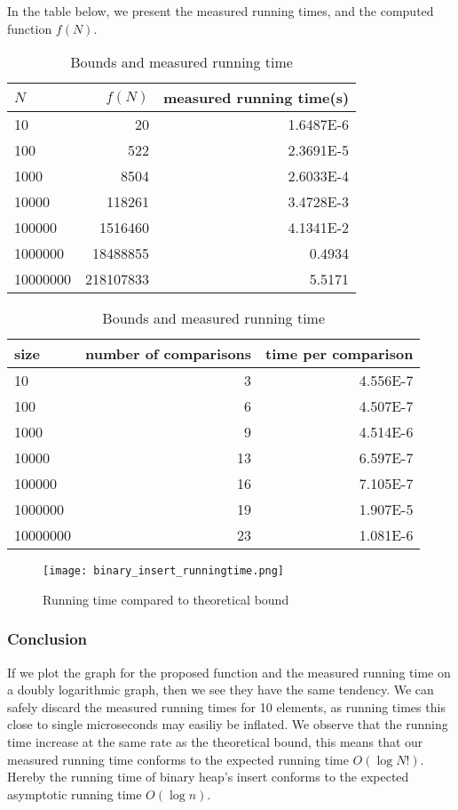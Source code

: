 \documentclass[a4paper,oneside,11pt]{article}
\begin{document}
\begin{itemize}
In the table below, we present the measured running times, and the computed function $f(N)$.
\begin{table}
  \begin{center}
    \begin{tabular}{l|r|r}
      $N$ & $f(N)$ & measured running time(s) \\
      \hline
      10       & 20         & \num{1.6487E-6}\\
      100      & 522        & \num{2.3691E-5}\\
      1000     & 8504       & \num{2.6033E-4}\\
      10000    & 118261     & \num{3.4728E-3}\\
      100000   & 1516460    & \num{4.1341E-2}\\
      1000000  & 18488855   & \num{0.4934}\\
      10000000 & 218107833  & \num{5.5171}
    \end{tabular}
    \caption{Bounds and measured running time}
  \end{center}
\end{table}
\begin{table}
  \begin{center}
    \begin{tabular}{l|r|r}
      size & number of comparisons & time per comparison\\
      \hline
      10       & 3  & \num{4.556E-7}\\
      100      & 6  & \num{4.507E-7}\\
      1000     & 9  & \num{4.514E-6}\\
      10000    & 13 & \num{6.597E-7}\\
      100000   & 16 & \num{7.105E-7}\\
      1000000  & 19 & \num{1.907E-5}\\
      10000000 & 23 & \num{1.081E-6}
    \end{tabular}
    \caption{Bounds and measured running time}
  \end{center}
\end{table}
\begin{figure}
  \texttt{[image: binary\_insert\_runningtime.png]}
  \caption{Running time compared to theoretical bound}
\end{figure}

\subsubsection*{Conclusion}
If we plot the graph for the proposed function and the measured running time on a doubly logarithmic graph, then we see they have the same tendency. We can safely discard the measured running times for 10 elements, as running times this close to single microseconds may easiliy be inflated. We observe that the running time increase at the same rate as the theoretical bound, this means that our measured running time conforms to the expected running time $O(\log N!)$. Hereby the running time of binary heap's insert conforms to the expected asymptotic running time $O(\log n)$.


\end{itemize}
\end{document}
